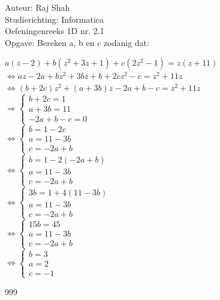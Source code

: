 \documentclass[a4paper]{article}
\begin{document}
  
\noindent \large Auteur: Raj Shah\\
\noindent \large Studierichting: Informatica\\
\noindent \large Oefeningenreeks 1D nr. 2.1\\

\medskip
\noindent \large Opgave: Bereken a, b en c zodanig dat:\\

\normalsize

$a\left(z-2\right) + b\left(z^2 + 3z + 1 \right) + c\left(2z^2 - 1 \right) = z\left(z + 11 \right)$\\

$\Leftrightarrow az -2a + bz^2 + 3bz + b +2cz^2 - c = z^2 + 11z$\\

$\Leftrightarrow \left(b + 2c\right)z^2 + \left(a + 3b\right)z - 2a + b - c = z^2 + 11z$\\ 

$\Rightarrow\left\{
	\begin{array}{l}
		b + 2c = 1\\
		a + 3b = 11\\
		-2a + b - c = 0
	\end{array}
\right.$\\ 

$\Leftrightarrow\left\{
	\begin{array}{l}
		b = 1 - 2c\\
		a = 11 - 3b\\
		c = -2a + b
	\end{array}
\right.$\\ 

$\Leftrightarrow\left\{
	\begin{array}{l}
		b = 1 - 2\left(-2a + b\right)\\
		a = 11 - 3b\\
		c = -2a + b
	\end{array}
\right.$\\ 

$\Leftrightarrow\left\{
	\begin{array}{l}
		3b = 1 + 4\left(11 - 3b\right)\\
		a = 11 - 3b\\
		c = -2a + b
	\end{array}
\right.$\\ 

$\Leftrightarrow\left\{
	\begin{array}{l}
		15b = 45\\
		a = 11 - 3b\\
		c = -2a + b
	\end{array}
\right.$\\ 

$\Leftrightarrow\left\{
	\begin{array}{l}
		b =3\\
		a = 2\\
		c = -1
	\end{array}
\right.$\\ 


\begin{thebibliography}{999}
\end{thebibliography}
\end{document}
